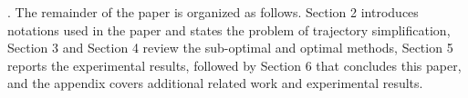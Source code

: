 .
The remainder of the paper is organized as follows.
Section 2 introduces notations used in the paper and states the problem of trajectory simplification,
Section 3 and Section 4 review the sub-optimal and optimal \lsa methods,
Section 5 reports the experimental results, followed by 
Section 6 that concludes this paper, and 
the appendix covers additional related work and experimental results.%



